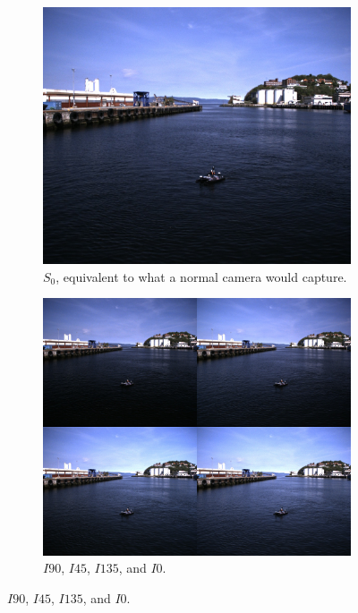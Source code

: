 \begin{figure}[H]
    \begin{subfigure}[T]{.49\textwidth}
        \includegraphics[width=\textwidth]{figures/img_0080_right_s0.jpg}
        \caption{$S_0$, equivalent to what a normal camera would capture.}
    \end{subfigure}
    \hfill
    \begin{subfigure}[T]{.49\textwidth}
        \includegraphics[width=\textwidth]{figures/img_0080_right_inten.jpg}
        \caption{$I90$, $I45$, $I135$, and $I0$.}
    \end{subfigure}
    

\end{figure}
